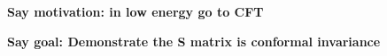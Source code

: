 {\bf\color{red} Say motivation: in low energy go to CFT}

{\bf\color{red} Say goal: Demonstrate the S matrix is conformal invariance}

